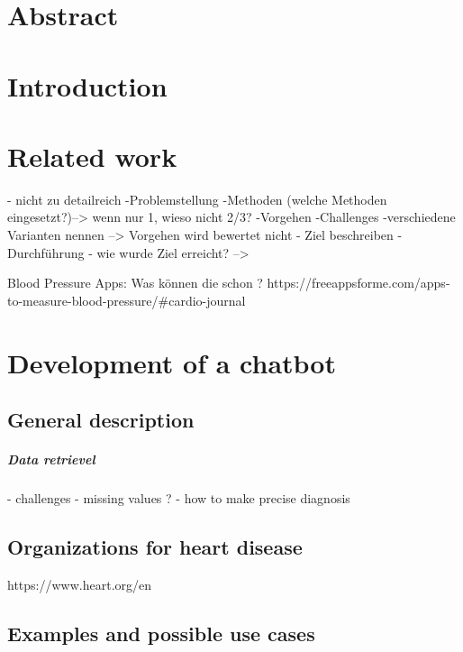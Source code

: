 




\chapter{Abstract}\label{abstract}


\chapter{Introduction}\label{introduction}

\chapter{Related work}\label{related}
- nicht zu detailreich
-Problemstellung
-Methoden (welche Methoden eingesetzt?)--> wenn nur 1, wieso nicht 2/3?
-Vorgehen
-Challenges
-verschiedene Varianten nennen
--> Vorgehen wird bewertet nicht 
- Ziel beschreiben
- Durchführung
- wie wurde Ziel erreicht? --> 

Blood Pressure Apps:
Was können die schon ? 
https://freeappsforme.com/apps-to-measure-blood-pressure/#cardio-journal


\chapter{Development of a chatbot}\label{chatbot}

\section{General description}\label{general_description}

\paragraph{Data retrievel}

- challenges 
- missing values ? 
- how to make precise diagnosis


\section{Organizations for heart disease}
https://www.heart.org/en

\section{Examples and possible use cases}\label{examples}
  
